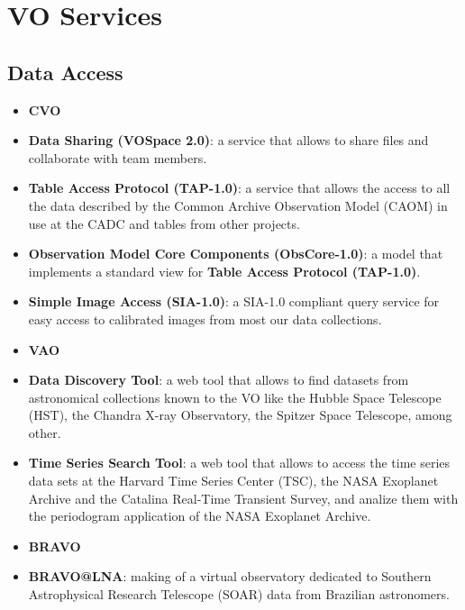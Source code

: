 \section{VO Services}
\subsection{Data Access}
\begin{itemize}
\item \textbf{CVO}
\item \textbf{Data Sharing (VOSpace 2.0)}:
a service that allows to share files and collaborate with team members.

\item \textbf{Table Access Protocol (TAP-1.0)}:
a service that allows the access to all the data
described by the Common Archive Observation Model (CAOM) in use at the CADC and
tables from other projects.

\item \textbf{Observation Model Core Components (ObsCore-1.0)}:
a model that implements a standard view for \textbf{Table Access Protocol (TAP-1.0)}.

\item \textbf{Simple Image Access (SIA-1.0)}:
a SIA-1.0 compliant query service for easy access to calibrated images from most
our data collections.

\item \textbf{VAO}
\item \textbf{Data Discovery Tool}:
a web tool that allows to find datasets from astronomical collections known to
the VO like the Hubble Space Telescope (HST), the Chandra X-ray Observatory, the
Spitzer Space Telescope, among other.

\item \textbf{Time Series Search Tool}:
a web tool that allows to access the time series data sets at the Harvard Time
Series Center (TSC), the NASA Exoplanet Archive and the Catalina Real-Time
Transient Survey, and analize them with the periodogram application of the NASA
Exoplanet Archive.

\item \textbf{BRAVO}
\item \textbf{BRAVO@LNA}:
making of a virtual observatory dedicated to Southern Astrophysical Research
Telescope (SOAR) data from Brazilian astronomers.  


\end{itemize}
